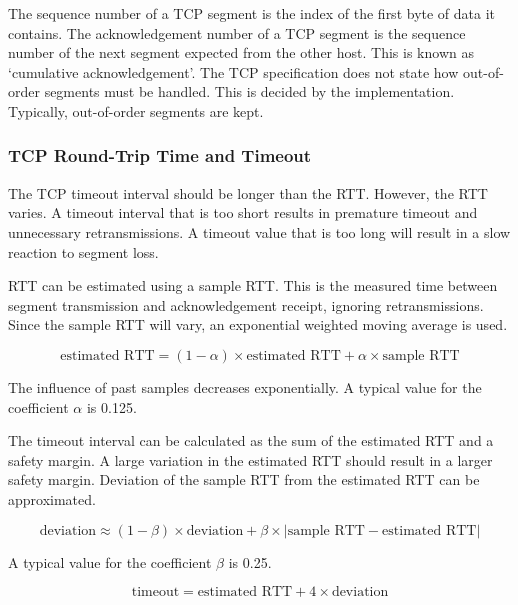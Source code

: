 The sequence number of a TCP segment is the index of the first byte of data it contains.
The acknowledgement number of a TCP segment is the sequence number of the next segment expected from the other host.
This is known as `cumulative acknowledgement'.
The TCP specification does not state how out-of-order segments must be handled.
This is decided by the implementation.
Typically, out-of-order segments are kept.

\subsubsection{TCP Round-Trip Time and Timeout}

The TCP timeout interval should be longer than the RTT\@.
However, the RTT varies.
A timeout interval that is too short results in premature timeout and unnecessary retransmissions.
A timeout value that is too long will result in a slow reaction to segment loss.

RTT can be estimated using a sample RTT\@.
This is the measured time between segment transmission and acknowledgement receipt, ignoring retransmissions.
Since the sample RTT will vary, an exponential weighted moving average is used.

\begin{equation*}
  \text{estimated RTT} = \left( 1 - \alpha \right) \times \text{estimated RTT} + \alpha \times \text{sample RTT}
\end{equation*}

The influence of past samples decreases exponentially.
A typical value for the coefficient \(\alpha\) is \num{0.125}.

The timeout interval can be calculated as the sum of the estimated RTT and a safety margin.
A large variation in the estimated RTT should result in a larger safety margin.
Deviation of the sample RTT from the estimated RTT can be approximated.

\begin{equation*}
  \text{deviation} \approx (1 - \beta) \times \text{deviation} + \beta \times \left| \text{sample RTT} - \text{estimated RTT} \right|
\end{equation*}

A typical value for the coefficient \(\beta\) is \num{0.25}.

\begin{equation*}
  \text{timeout} = \text{estimated RTT} + 4 \times \text{deviation}
\end{equation*}

